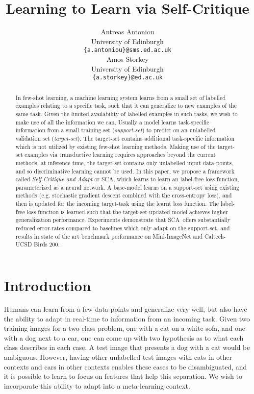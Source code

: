 \documentclass{article} \usepackage[dvipsnames]{xcolor}
\title{Learning to Learn via Self-Critique}
\author{Antreas Antoniou \\
University of Edinburgh\\
\texttt{\{a.antoniou\}@sms.ed.ac.uk} \\
\And
Amos Storkey \\
University of Edinburgh\\
\texttt{\{a.storkey\}@ed.ac.uk}}
\newcommand{\proposedmethod}{SCA}
\begin{document}
\maketitle

\begin{abstract}
In few-shot learning, a machine learning system learns from a small set of labelled examples relating to a specific task, such that it can generalize to new examples of the same task. Given the limited availability of labelled examples in such tasks, we wish to make use of all the information we can. Usually a model learns task-specific information from a small training-set (\emph{support-set}) to predict on an unlabelled validation set (\emph{target-set}). The target-set contains additional task-specific information which is not utilized by existing few-shot learning methods. Making use of the target-set examples via transductive learning requires approaches beyond the current methods; at inference time, the target-set contains only unlabelled input data-points, and so discriminative learning cannot be used. In this paper, we propose a framework called \emph{Self-Critique and Adapt} or \proposedmethod, which learns to learn an label-free loss function, parameterized as a neural network. A base-model learns on a support-set using existing methods (e.g. stochastic gradient descent combined with the cross-entropy loss), and then is updated for the incoming target-task using the learnt loss function. The label-free loss function is learned such that the target-set-updated model achieves higher generalization performance. Experiments demonstrate that \proposedmethod\ offers substantially reduced error-rates compared to baselines which only adapt on the support-set, and results in state of the art benchmark performance on Mini-ImageNet and Caltech-UCSD Birds 200.

\end{abstract}

\section{Introduction}
Humans can learn from a few data-points and generalize very well, but also have the ability to adapt in real-time to information from an incoming task. Given two training images for a two class problem, one with a cat on a white sofa, and one with a dog next to a car, one can come up with two hypothesis as to what each class describes in each case. A test image that presents a dog with a cat would be ambiguous. However, having other unlabelled test images with cats in other contexts and cars in other contexts enables these cases to be disambiguated, and it is possible to learn to focus on features that help this separation. We wish to incorporate this ability to adapt into a meta-learning context.
\end{document}
